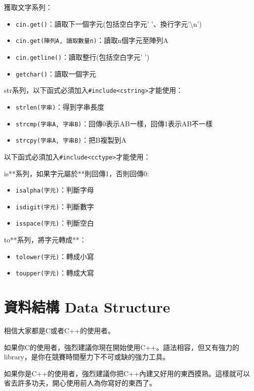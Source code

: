 \documentclass[a4paper, 11pt, oneside]{book}
\begin{document}
獲取文字系列：
\begin{itemize}
\item \texttt{cin.get()}：讀取下一個字元(包括空白字元' '、換行字元'\textbackslash{}n')
\item \texttt{cin.get(陣列A, 讀取數量n)}：讀取n個字元至陣列A
\item \texttt{cin.getline()}：讀取整行(包括空白字元' ')
\item \texttt{getchar()}：讀取一個字元
\end{itemize}
str系列，以下函式必須加入\texttt{\#include<cstring>}才能使用：
\begin{itemize}
\item \texttt{strlen(字串)}：得到字串長度
\item \texttt{strcmp(字串A, 字串B)}：回傳0表示AB一樣，回傳1表示AB不一樣
\item \texttt{strcpy(字串A, 字串B)}：把B複製到A
\end{itemize}
以下函式必須加入\texttt{\#include<cctype>}才能使用：

is**系列，如果字元屬於**則回傳1，否則回傳0:
\begin{itemize}
\item \texttt{isalpha(字元)}：判斷字母
\item \texttt{isdigit(字元)}：判斷數字
\item \texttt{isspace(字元)}：判斷空白
\end{itemize}

to**系列，將字元轉成**：
\begin{itemize}
\item \texttt{tolower(字元)}：轉成小寫
\item \texttt{toupper(字元)}：轉成大寫
\end{itemize}

\chapter{資料結構 Data Structure}

相信大家都是C或者C++的使用者。

如果你C的使用者，強烈建議你現在開始使用C++。語法相容，但又有強力的library，是你在競賽時間壓力下不可或缺的強力工具。

如果你是C++的使用者，強烈建議你把C++內建又好用的東西摸熟。這樣就可以省去許多功夫，開心使用前人為你寫好的東西了。
\end{document}
